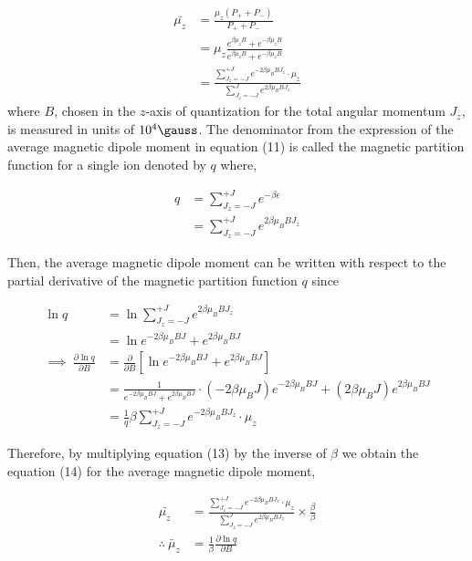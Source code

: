 \documentclass[a4paper,11pt]{article}
\begin{document}
\begin{align}
\bar{\mu_z}	& = \frac{\mu_z (P_+ + P_-)}{P_+ + P_-}\nonumber\\
			& = \mu_z \frac{e^{\beta \mu_z B} + e^{-\beta \mu_z B}}{e^{\beta \mu_z B} + e^{-\beta \mu_z B}}\nonumber\\
			& = \frac{\sum_{J_z = -J}^{+J} e^{-2 \beta \mu_B B J_z} \cdot \mu_z}{\sum_{J_z = -J}^{J} e^{2 \beta \mu_B B J_z}}
\end{align}
where $B$, chosen in the $z$-axis of quantization for the total angular momentum $J_z$, is measured in units of ${10^{4}}\si{\gauss}$. The denominator from the expression of the average magnetic dipole moment in equation (11) is called the magnetic partition function for a single ion denoted by $q$ where,

\begin{align}
q	& = \sum_{J_z = -J}^{+J} e^{-\beta \epsilon}\nonumber\\
	& = \sum_{J_z = -J}^{+J} e^{2 \beta \mu_B B J_z}
\end{align}

Then, the average magnetic dipole moment can be written with respect to the partial derivative of the magnetic partition function $q$ since

\begin{align}
\ln{q}										& = \ln{\sum_{J_z = -J}^{+J} e^{2 \beta \mu_B B J_z}}\nonumber\\
											& = \ln{e^{-2 \beta \mu_B B J} + e^{2 \beta \mu_B B J}}\nonumber\\
\implies~\frac{\partial \ln{q}}{\partial B}	& = \frac{\partial}{\partial B}\left[ \ln{e^{-2 \beta \mu_B B J} + e^{2 \beta \mu_B 												    B J}} \right]\nonumber\\
											& = \frac{1}{e^{-2 \beta \mu_B B J} + e^{2 \beta \mu_B B J}} \cdot 
											    (-2 \beta \mu_B J)e^{-2 \beta \mu_B B J} + 
											    (2 \beta \mu_B J) e^{2 \beta \mu_B B J}\nonumber\\
											& = \frac{1}{q} \beta \sum_{J_z = -J}^{+J} e^{-2 \beta \mu_B B J_z} 
												\cdot \mu_z
\end{align}

Therefore, by multiplying equation (13) by the inverse of $\beta$ we obtain the equation (14) for the average magnetic dipole moment,

\begin{align}
\bar{\mu_z}	& = \frac{\sum_{J_z = -J}^{+J} e^{-2 \beta \mu_B B J_z} \cdot \mu_z}{\sum_{J_z = -J}^{J} e^{2 \beta \mu_B B J_z}} 						\times \frac{\beta}{\beta}\nonumber\\
\therefore~\bar{\mu}_z	& = \frac{1}{\beta}\frac{\partial \ln{q}}{\partial B}
\end{align}
\end{document}

